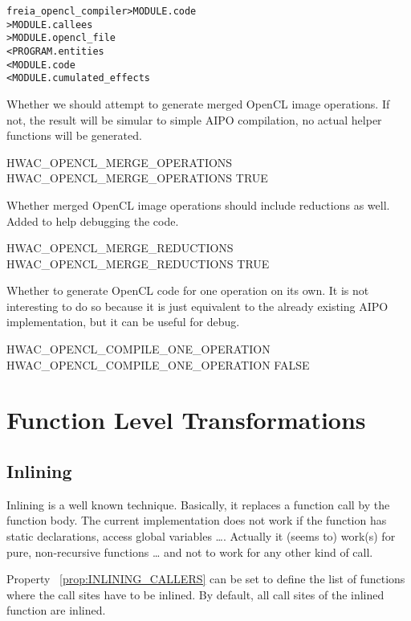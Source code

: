 \documentclass[a4paper]{report}
\newenvironment{PipsMake}{\begin{alltt}}{\end{alltt}}
\newcommand{\PipsPropRef}[1]{\texttt{\detokenize{#1}}~\ref{prop:#1}}
\newenvironment{PipsPass}[1]{\label{pass:#1}}{}
\begin{document}
\begin{PipsMake}
freia_opencl_compiler  > MODULE.code
                       > MODULE.callees
                       > MODULE.opencl_file
        < PROGRAM.entities
        < MODULE.code
        < MODULE.cumulated_effects
\end{PipsMake}

Whether we should attempt to generate merged OpenCL image operations.
If not, the result will be simular to simple AIPO compilation,
no actual helper functions will be generated.
\begin{PipsProp}{HWAC_OPENCL_MERGE_OPERATIONS}
HWAC_OPENCL_MERGE_OPERATIONS TRUE
\end{PipsProp}

Whether merged OpenCL image operations should include reductions as well.
Added to help debugging the code.
\begin{PipsProp}{HWAC_OPENCL_MERGE_REDUCTIONS}
HWAC_OPENCL_MERGE_REDUCTIONS TRUE
\end{PipsProp}

Whether to generate OpenCL code for one operation on its own.
It is not interesting to do so because it is just equivalent to
the already existing AIPO implementation, but it can be useful for
debug.
\begin{PipsProp}{HWAC_OPENCL_COMPILE_ONE_OPERATION}
HWAC_OPENCL_COMPILE_ONE_OPERATION FALSE
\end{PipsProp}


\section{Function Level Transformations}



\subsection{Inlining}
\label{subsection-inlining}

\begin{PipsPass}{inlining}
Inlining is a well known technique.  Basically, it replaces a function
call by the function body. The current implementation does not work if
the function has static declarations, access global variables \dots.
Actually it (seems to) work(s) for pure, non-recursive functions \dots
and not to work for any other kind of call.

Property \PipsPropRef{INLINING_CALLERS} can be set to define the list of
functions where the call sites have to be inlined. By default, all
call sites of the inlined function are inlined.
\end{PipsPass}
\end{document}
